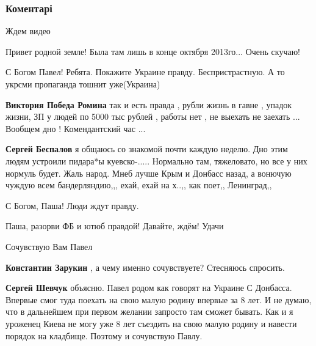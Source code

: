  
 
 
 
 
\subsubsection{Коментарі}

\begin{itemize} %
Ждем видео

Привет родной земле! Была там лишь в конце октября 2013го...
Очень скучаю!

С Богом Павел! Ребята. Покажите Украине правду. Беспристрастную. А то укрсми пропаганда тошнит уже(Украина)

\begin{itemize} %
\textbf{Виктория Победа Ромина} так и есть правда , рубли жизнь в гавне , упадок жизни, ЗП у людей по 5000 тыс рублей , работы нет , не выехать не заехать ... Вообщем дно ! Комендантский час ...

\textbf{Сергей Беспалов} я общаюсь со знакомой почти каждую неделю. Дно этим людям устроили пидара*ы куевско-..... Нормально там, тяжеловато, но все у них нормуль будет. Жаль народ. Мнеб лучше Крым и Донбасс назад, а вонючую чуждую всем бандерляндию,,, ехай, ехай на х..,, как поет,, Ленинград,,
\end{itemize} %

С Богом, Паша! Люди ждут правду.

Паша, разорви ФБ и ютюб правдой! Давайте, ждём! Удачи

Сочувствую Вам Павел

\begin{itemize} %
\textbf{Константин Зарукин} , а чему именно сочувствуете? Стесняюсь спросить.

\textbf{Сергей Шевчук} объясню. Павел родом как говорят на Украине С Донбасса. Впервые смог туда поехать на свою малую родину впервые за 8 лет. И не думаю, что в дальнейшем при первом желании запросто там сможет бывать. Как и я уроженец Киева не могу уже 8 лет съездить на свою малую родину и навести порядок на кладбище. Поэтому и сочувствую Павлу.


\end{itemize}
\end{itemize}
